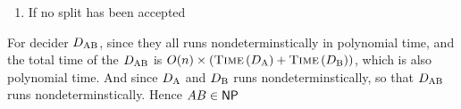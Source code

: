 \documentclass[11pt]{article}
\begin{document}
\begin{enumerate}
{\begin{itemize}
\begin{enumerate}
\begin{enumerate}
            \item Run $D_\textnormal{A}$ on input $x$
            \item If $D_\textnormal{A}$ reject $x$ $\to \textnormal{continue}$
            \item Run $D_\textnormal{B}$ on input $y$
            \item If $D_\textnormal{B}$ accept $y$ \tmAcc
            \item Otherwise $\to \textnormal{continue}$''
        \end{enumerate}
        \item If no split has been accepted \tmRej
    \end{enumerate}
\end{itemize}
For decider $D_\textnormal{AB}$, since they all runs nondeterminstically in polynomial time, and the total time of the $D_\textnormal{AB}$ is $O(n)\times(\textsc{Time}\left(D_\textnormal{A}\right) + \textsc{Time}\left(D_\textnormal{B}\right))$, which is also polynomial time. And since $D_\textnormal{A}$ and $D_\textnormal{B}$ runs nondeterminstically, so that $D_\textnormal{AB}$ runs nondeterminstically. Hence $AB \in \textsf{NP}$
}

\end{enumerate}
\end{document}
